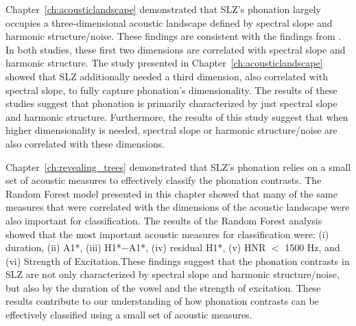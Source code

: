 Chapter~\ref{ch:acousticlandscape} demonstrated that SLZ's phonation largely occupies a three-dimensional acoustic landscape defined by spectral slope and harmonic structure/noise. These findings are consistent with the findings from \citet{keatingCrosslanguageAcousticSpace2023}. In both studies, these first two dimensions are correlated with spectral slope and harmonic structure. The study presented in Chapter~\ref{ch:acousticlandscape} showed that SLZ additionally needed a third dimension, also correlated with spectral slope, to fully capture phonation's dimensionality. The results of these studies suggest that phonation is primarily characterized by just spectral slope and harmonic structure. Furthermore, the results of this study suggest that when higher dimensionality is needed, spectral slope or harmonic structure/noise are also correlated with these dimensions.

Chapter~\ref{ch:revealing_trees} demonstrated that SLZ's phonation relies on a small set of acoustic measures to effectively classify the phonation contrasts. The Random Forest model presented in this chapter showed that many of the same measures that were correlated with the dimensions of the acoustic landscape were also important for classification. The results of the Random Forest analysis showed that the most important acoustic measures for classification were: (i) duration, (ii) A1*, (iii) H1*$-$A1*, (iv) residual H1*, (v) HNR $<$ 1500 Hz, and (vi) Strength of Excitation.These findings suggest that the phonation contrasts in SLZ are not only characterized by spectral slope and harmonic structure/noise, but also by the duration of the vowel and the strength of excitation. These results contribute to our understanding of how phonation contrasts can be effectively classified using a small set of acoustic measures.

